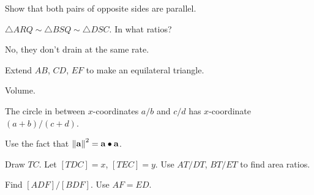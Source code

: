 \documentclass[11pt,paper=letter]{scrartcl}
\begin{document}
\begin{enumthin}[leftmargin=0pt]
\item \label{h:vs02} Show that both pairs of opposite sides are parallel.
\item \label{h:rd51} $\triangle ARQ \sim \triangle BSQ \sim \triangle DSC$. In what ratios?
\item \label{h:an41} No, they don't drain at the same rate.
\item \label{h:gb82} Extend $AB$, $CD$, $EF$ to make an equilateral triangle.
\item \label{h:dg41} Volume.
\item \label{h:dt42} The circle in between $x$-coordinates $a/b$ and $c/d$ has $x$-coordinate $(a+b)/(c+d)$.
\item \label{h:eq21} Use the fact that $\left\lVert \mathbf a \right\rVert^2 = \mathbf a \bullet \mathbf a$.
\item \label{h:rt53} Draw $TC$. Let $[TDC] = x$, $[TEC] = y$. Use $AT/DT$, $BT/ET$ to find area ratios.
\item \label{h:gbx1} Find $[ADF]/[BDF]$. Use $AF = ED$.
\end{enumthin}
\end{document}
